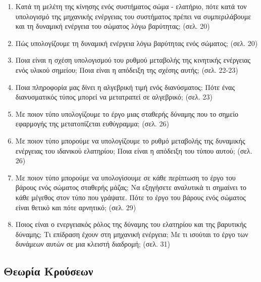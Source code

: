 \documentclass{article}
\begin{document}
\begin{enumerate}
      \item
            Κατά τη μελέτη της κίνησης ενός συστήματος σώμα - ελατήριο, πότε κατά τον υπολογισμό της μηχανικής ενέργειας του συστήματος πρέπει να συμπεριλάβουμε και τη δυναμική ενέργεια του σώματος λόγω βαρύτητας; (σελ. 20)

      \item
            Πώς υπολογίζουμε τη δυναμική ενέργεια λόγω βαρύτητας ενός σώματος; (σελ. 20)

      \item
            Ποια είναι η σχέση υπολογισμού του ρυθμού μεταβολής της κινητικής ενέργειας ενός υλικού σημείου; Ποια είναι η απόδειξη της σχέσης αυτής; (σελ. 22-23)

      \item
            Ποια πληροφορία μας δίνει η αλγεβρική τιμή ενός διανύσματος; Πότε ένας διανυσματικός τύπος μπορεί να μετατραπεί σε αλγεβρικό; (σελ. 23)

      \item
            Με ποιον τύπο υπολογίζουμε το έργο μιας σταθερής δύναμης που το σημείο εφαρμογής της μετατοπίζεται ευθύγραμμα; (σελ. 26)

      \item
            Με ποιον τύπο μπορούμε να υπολογίζουμε το ρυθμό μεταβολής της δυναμικής ενέργειας του ιδανικού ελατηρίου; Ποια είναι η απόδειξη του τύπου αυτού; (σελ. 26)

      \item
            Με ποιον τύπο μπορούμε να υπολογίσουμε σε κάθε περίπτωση το έργο του βάρους ενός σώματος σταθερής μάζας; Να εξηγήσετε αναλυτικά τι σημαίνει το κάθε μέγεθος στον τύπο που γράψατε. Πότε το έργο του βάρους ενός σώματος είναι θετικό και πότε αρνητικό; (σελ. 29)

      \item
            Ποιος είναι ο ενεργειακός ρόλος της δύναμης του ελατηρίου και της βαρυτικής δύναμης; Τι επίδραση έχουν στη μηχανική ενέργεια; Με τι ισούται το έργο των δυνάμεων αυτών σε μια κλειστή διαδρομή; (σελ. 31)
\end{enumerate}

\subsection{Θεωρία Κρούσεων}
\end{document}
